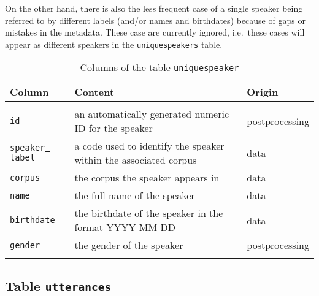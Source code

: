 \documentclass[a4paper, 11pt]{book}
\newcommand{\und}{\underline{{ }}\hspace{0.2mm}}	%
\begin{document}
On the other hand, there is also the less frequent case of a single speaker being referred to by different labels (and/or names and birthdates) because of gaps or mistakes in the metadata. These case are currently ignored, i.e.\ these cases will appear as different speakers in the \texttt{uniquespeakers} table. 

\begin{longtable}{lp{.5\linewidth}p{.2\linewidth}}
	\toprule
		\textbf{Column} & \textbf{Content} 	& \textbf{Origin} \\
	\midrule
	\endhead
	
	\bottomrule\\[-0.15cm]
	\caption{Columns of the table \texttt{uniquespeaker}}
	\endfoot
	
		\texttt{id} 		& an automatically generated numeric ID for the speaker & postprocessing \\
		\texttt{speaker\und label} & a code used to identify the speaker within the associated corpus & data \\
		\texttt{corpus} 	& the corpus the speaker appears in & data \\ 
		\texttt{name}		& the full name of the speaker & data \\
		\texttt{birthdate} 	& the birthdate of the speaker in the format YYYY-MM-DD & data \\ 
		\texttt{gender} 	& the gender of the speaker & postprocessing \\[-0.3cm]
	\label{tab:Table uniquespeakers}
\end{longtable}


\subsection{Table \texttt{utterances}}
\label{subsec:Table utterances}
\end{document}
